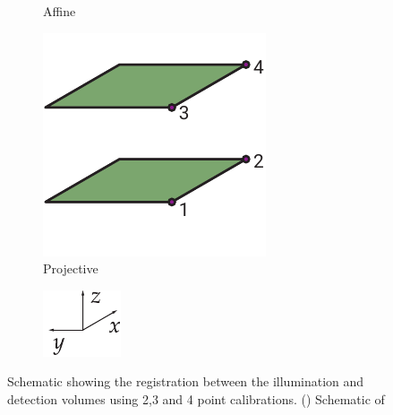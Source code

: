 \begin{figure}
\begin{subfigure}[t]{0.2\textwidth}
        \caption{Affine}\label{fig:geometry/affine}
    \end{subfigure}\hfill
    \begin{subfigure}[t]{0.2\textwidth}
        \centering
        \includegraphics[width=\textwidth]{geometry/projective}
        \caption{Projective}\label{fig:geometry/projective}
    \end{subfigure}
    \begin{subfigure}[t]{0.1\textwidth}
        \centering
        \includegraphics{geometry/coordinates}
    \end{subfigure}
    \caption[Schematic showing the registration between the illumination and detection volumes using 2,3 and 4 point calibrations]{
    Schematic showing the registration between the illumination and detection volumes using 2,3 and 4 point calibrations.
    () Schematic of %
}
\end{figure}
